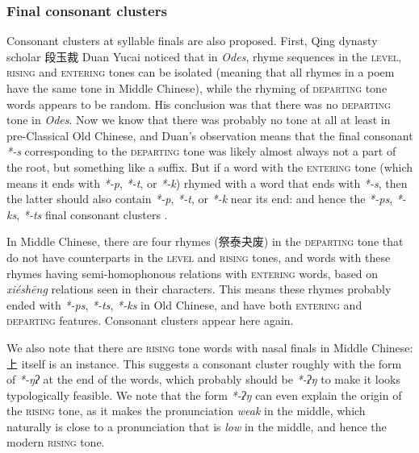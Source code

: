 \documentclass[UTF8, a4paper, oneside, scheme=plain, 12pt]{ctexrep}
\newcommand*{\citepage}[1]{p.~{#1}}
\newcommand{\form}[1]{\emph{#1}}
\newcommand{\work}[1]{\textit{#1}}
\newcommand*{\category}[1]{\textsc{#1}}
\begin{document}
\subsubsection{Final consonant clusters}
Consonant clusters at syllable finals are also proposed.
First, Qing dynasty scholar 段玉裁 Duan Yucai noticed that
in \work{Odes}, rhyme sequences in the \category{level}, \category{rising} and \category{entering} tones
can be isolated (meaning that all rhymes in a poem have the same tone in Middle Chinese),
while the rhyming of \category{departing} tone words appears to be random.
His conclusion was that there was no \category{departing} tone in \work{Odes}.
Now we know that there was probably no tone at all at least in pre-Classical Old Chinese,
and Duan's observation means that
the final consonant \form{*-s} corresponding to the \category{departing} tone
was likely almost always not a part of the root, but something like a suffix.
But if a word with the \category{entering} tone (which means it ends with \form{*-p}, \form{*-t}, or \form{*-k})
rhymed with a word that ends with \form{*-s},
then the latter should also contain \form{*-p}, \form{*-t}, or \form{*-k} near its end:
and hence the \form{*-ps}, \form{*-ks}, \form{*-ts} final consonant clusters
\citep[\citepage{183}]{hill2019historical}.

In Middle Chinese, there are four rhymes (祭泰夬废) in the \category{departing} tone
that do not have counterparts in the \category{level} and \category{rising} tones,
and words with these rhymes having semi-homophonous relations with \category{entering} words,
based on \form{xiéshēng} relations seen in their characters.
This means these rhymes probably ended with \form{*-ps}, \form{*-ts}, \form{*-ks} in Old Chinese,
and have both \category{entering} and \category{departing} features.
Consonant clusters appear here again.

We also note that there are \category{rising} tone words with nasal finals in Middle Chinese:
上 itself is an instance.
This suggests a  consonant cluster roughly with the form of \form{*-ŋʔ} at the end of the words,
which probably should be \form{*-ʔŋ} to make it looks typologically feasible.
We note that the form \form{*-ʔŋ} can even explain the origin of the \category{rising} tone,
as it makes the pronunciation \emph{weak} in the middle,
which naturally is close to a pronunciation that is \emph{low} in the middle,
and hence the modern \category{rising} tone.
\end{document}
